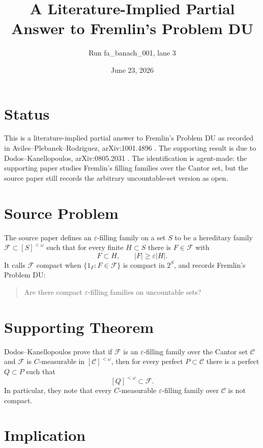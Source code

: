 \documentclass[11pt]{article}
\title{A Literature-Implied Partial Answer to Fremlin's Problem DU}
\author{Run fa\_banach\_001, lane 3}
\date{June 23, 2026}
\begin{document}
\maketitle

\section*{Status}

This is a literature-implied partial answer to Fremlin's Problem DU as recorded
in Aviles--Plebanek--Rodriguez, arXiv:1001.4896 \cite{APR2010}. The supporting
result is due to Dodos--Kanellopoulos, arXiv:0805.2031 \cite{DK2008}. The
identification is agent-made: the supporting paper studies Fremlin's filling
families over the Cantor set, but the source paper still records the arbitrary
uncountable-set version as open.

\section*{Source Problem}

The source paper defines an \(\varepsilon\)-filling family on a set \(S\) to be
a hereditary family \(\mathcal F\subset [S]^{<\omega}\) such that for every
finite \(H\subset S\) there is \(F\in\mathcal F\) with
\[
  F\subset H,\qquad |F|\ge \varepsilon |H|.
\]
It calls \(\mathcal F\) compact when \(\{1_F:F\in\mathcal F\}\) is compact in
\(2^S\), and records Fremlin's Problem DU:

\begin{quote}
Are there compact \(\varepsilon\)-filling families on uncountable sets?
\end{quote}

\section*{Supporting Theorem}

Dodos--Kanellopoulos prove that if \(\mathcal F\) is an
\(\varepsilon\)-filling family over the Cantor set \(\mathcal C\) and
\(\mathcal F\) is \(C\)-measurable in \([\mathcal C]^{<\omega}\), then for
every perfect \(P\subset\mathcal C\) there is a perfect \(Q\subset P\) such
that
\[
  [Q]^{<\omega}\subset \mathcal F.
\]
In particular, they note that every \(C\)-measurable
\(\varepsilon\)-filling family over \(\mathcal C\) is not compact.

\section*{Implication}
\end{document}
